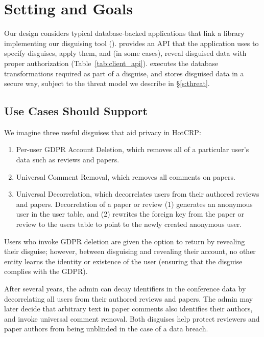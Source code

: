 \section{Setting and Goals}
Our design considers typical database-backed applications that link a library implementing our disguising
tool (\sys).
%
\sys provides an API that the application uses to specify disguises, apply them, and (in some
cases), reveal disguised data with proper authorization (Table~\ref{tab:client_api}).
%
\sys executes the database transformations required as part of a disguise, and stores
disguised data in a secure way, subject to the threat model we describe in \S\ref{s:threat}.

\subsection{Use Cases \sys Should Support}

We imagine three useful disguises that aid privacy in HotCRP: 
\begin{enumerate}
    \item Per-user GDPR Account Deletion, which
        removes all of a particular user's data such as reviews and papers.
    \item Universal Comment Removal, which removes all comments on papers.
    \item Universal Decorrelation, which decorrelates users from
        their authored reviews and papers. Decorrelation of a paper or review (1) generates an
        anonymous user in the user table, and (2) rewrites the foreign key from the paper or review
        to the users table to point to the newly created anonymous user.
\end{enumerate}

Users who invoke GDPR deletion are given the option to return by revealing their disguise; however,
between disguising and revealing their account, no other entity learns the identity or existence of
the user (ensuring that the disguise complies with the GDPR).

After several years, the admin can decay identifiers in the conference data by decorrelating all
users from their authored reviews and papers.  The admin may later decide that arbitrary text in
paper comments also identifies their authors, and invoke universal comment removal.  Both disguises
help protect reviewers and paper authors from being unblinded in the case of a data breach.

